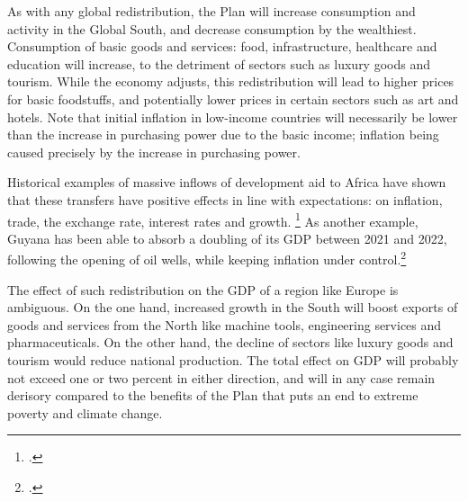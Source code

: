 \documentclass[a5paper,english,openany]{memoir}
\begin{document}
As with any global redistribution, the Plan will increase consumption and activity in the Global South, and decrease consumption by the wealthiest. Consumption of basic goods and services: food, infrastructure, healthcare and education  %
will increase, to the detriment of sectors such as luxury goods and tourism. While the economy adjusts, this redistribution will lead to higher prices for basic foodstuffs, and potentially lower prices in certain sectors such as art and hotels. %
Note that initial inflation in low-income countries will necessarily be lower than the increase in purchasing power due to the basic income; inflation being caused precisely by the increase in purchasing power. %

Historical examples of massive inflows of development aid to Africa have shown that these transfers have positive effects in line with expectations: on inflation, trade, the exchange rate, interest rates and growth. %
\footnote{\citet{berg_macroeconomics_2007,strand_revenue_2009}.} As another example, Guyana has been able to absorb a doubling of its GDP between 2021 and 2022, following the opening of oil wells, %
while keeping inflation under control.\footnote{\citet{fmi_guyana_2023}.} 

The effect of such redistribution on the GDP of a region like Europe is ambiguous. On the one hand, increased growth in the South will boost exports of goods and services from the North  like machine tools, engineering services and pharmaceuticals. %
On the other hand, the decline of sectors like luxury goods and tourism would reduce national production. 
The total effect on GDP will probably not exceed one or two percent in either direction, and will in any case remain derisory compared to the benefits of the Plan that puts an end to extreme poverty and climate change. %
\end{document}
